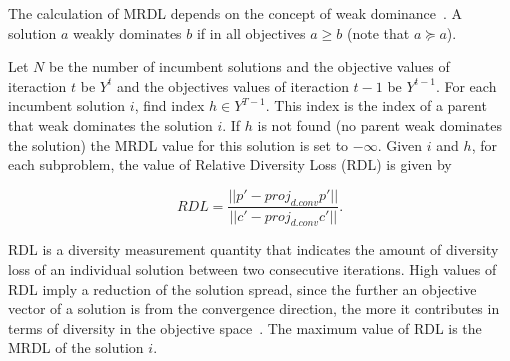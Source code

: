The calculation of MRDL depends on the concept of weak dominance~\cite{zitzler2003performance}. A solution $a$ weakly dominates $b$ if in all objectives $a \geq b$ (note that $a \succeq a$).
 
Let $N$ be the number of incumbent solutions and the objective values of iteraction $t$ be $Y^t$ and the objectives values of iteraction $t-1$ be $Y^{t-1}$. For each incumbent solution $i$, find index $h \in Y^{T-1}$. This index is the index of a parent that weak dominates the solution $i$. If $h$ is not found (no parent weak dominates the solution) the MRDL value for this solution is set to $-\infty$. Given $i$ and $h$, for each subproblem, the value of Relative Diversity Loss (RDL) is given by 

\begin{equation}
RDL = \dfrac{ ||p \prime - proj_{d.conv}p \prime|| }{||c \prime - proj_{d.conv}c \prime||}.
\end{equation}


RDL is a diversity measurement quantity that indicates the amount of diversity loss of an individual solution between two consecutive iterations. High values of RDL imply a reduction of the solution spread, since the further an objective vector of a solution is from the convergence direction, the more it contributes in terms of diversity in the objective space~\cite{gee2015online}. The maximum value of RDL is the MRDL of the solution $i$.


